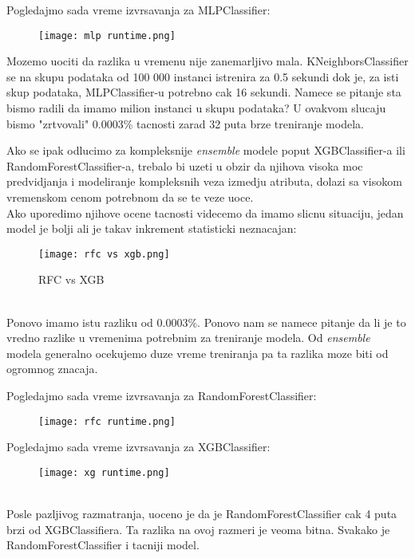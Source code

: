 \documentclass[10pt]{article}
\begin{document}
Pogledajmo sada vreme izvrsavanja za MLPClassifier:
\begin{figure}[h]
    \centering
    \texttt{[image: mlp runtime.png]}
    \label{Slika7}
\end{figure}

Mozemo uociti da razlika u vremenu nije zanemarljivo mala. KNeighborsClassifier se na skupu podataka od 100 000 instanci istrenira za 0.5 sekundi dok je, za isti skup podataka, MLPClassifier-u potrebno cak 16 sekundi. Namece se pitanje sta bismo radili da imamo milion instanci u skupu podataka? U ovakvom slucaju bismo "zrtvovali" 0.0003\% tacnosti zarad 32 puta brze treniranje modela. \pagebreak

Ako se ipak odlucimo za kompleksnije \textit{ensemble} modele poput XGBClassifier-a ili RandomForestClassifier-a, trebalo bi uzeti u obzir da njihova visoka moc predvidjanja i modeliranje kompleksnih veza izmedju atributa, dolazi sa visokom vremenskom cenom potrebnom da se te veze uoce.\\

Ako uporedimo njihove ocene tacnosti videcemo da imamo slicnu situaciju, jedan model je bolji ali je takav inkrement statisticki neznacajan:
\begin{figure}[h]
    \centering
    \texttt{[image: rfc vs xgb.png]}
    \caption{RFC vs XGB}
    \label{Slika8}
\end{figure}\\

Ponovo imamo istu razliku od 0.0003\%. Ponovo nam se namece pitanje da li je to vredno razlike u vremenima potrebnim za treniranje modela. Od \textit{ensemble} modela generalno ocekujemo duze vreme treniranja pa ta razlika moze biti od ogromnog znacaja.

\pagebreak
Pogledajmo sada vreme izvrsavanja za RandomForestClassifier:
\begin{figure}[h]
    \centering
    \texttt{[image: rfc runtime.png]}
    \label{Slika9}
\end{figure}

Pogledajmo sada vreme izvrsavanja za XGBClassifier:
\begin{figure}[h]
    \centering
    \texttt{[image: xg runtime.png]}
    \label{Slika10}
\end{figure}
\\

Posle pazljivog razmatranja, uoceno je da je RandomForestClassifier cak 4 puta brzi od XGBClassifiera. Ta razlika na ovoj razmeri je veoma bitna. Svakako je RandomForestClassifier i tacniji model.\\
\end{document}
